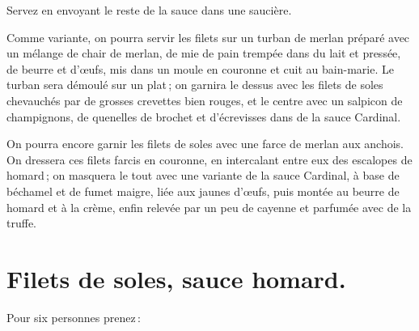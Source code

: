 Servez en envoyant le reste de la sauce dans une saucière.

\sk

Comme variante, on pourra servir les filets sur un turban de merlan préparé
avec un mélange de chair de merlan, de mie de pain trempée dans du lait et
pressée, de beurre et d'œufs, mis dans un moule en couronne et cuit au
bain-marie. Le turban sera démoulé sur un plat ; on garnira le dessus avec les
filets de soles chevauchés par de grosses crevettes bien rouges, et le centre
avec un salpicon de champignons, de quenelles de brochet et d'écrevisses dans
de la sauce Cardinal.

\sk

On pourra encore garnir les filets de soles avec une farce de merlan aux
anchois. On dressera ces filets farcis en couronne, en intercalant entre eux
des escalopes de homard ; on masquera le tout avec une variante de la sauce
Cardinal, à base de béchamel et de fumet maigre, liée aux jaunes d'œufs, puis
montée au beurre de homard et à la crème, enfin relevée par un peu de cayenne
et parfumée avec de la truffe.

\section*{\centering Filets de soles, sauce homard.}
\label{pg0369} \hypertarget{p0369}{}

Pour six personnes prenez :

\medskip

